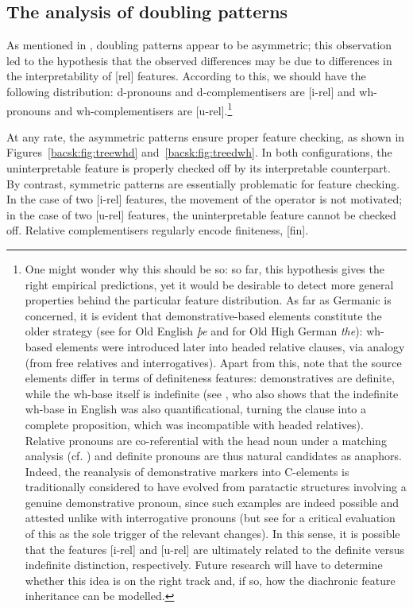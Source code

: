 \documentclass[output=paper]{langscibook}
\begin{document}
\subsection{The analysis of doubling patterns} \label{bacsk:sec:analysisdoubling}
As mentioned in , doubling patterns appear to be asymmetric; this observation led \citet{bacskaiatkari2020jcgl} to the hypothesis that the observed differences may be due to differences in the interpretability of [rel] features. According to this, we should have the following distribution: d-pronouns and d-complementisers are [i-rel] and wh-pronouns and wh-complementisers are [u-rel].\footnote{One might wonder why this should be so: so far, this hypothesis gives the right empirical predictions, yet it would be desirable to detect more general properties behind the particular feature distribution. As far as Germanic is concerned, it is evident that demonstrative-based elements constitute the older strategy (see \citealt[467]{ringetaylor2014} for Old English \textit{þe} and \citealt[46]{axeltober2017} for Old High German \textit{the}): wh-based elements were introduced later into headed relative clauses, via analogy (from free relatives and interrogatives). Apart from this, note that the source elements differ in terms of definiteness features: demonstratives are definite, while the wh-base itself is indefinite (see \citealt{watanabe2009}, who also shows that the indefinite wh-base in English was also quantificational, turning the clause into a complete proposition, which was incompatible with headed relatives). Relative pronouns are co-referential with the head noun under a matching analysis (cf. \citealt[55--179]{salzmann2017}) and definite pronouns are thus natural candidates as anaphors. Indeed, the reanalysis of demonstrative markers into C-elements is traditionally considered to have evolved from paratactic structures involving a genuine demonstrative pronoun, since such examples are indeed possible and attested unlike with interrogative pronouns (but see \citealt{axeltober2017} for a critical evaluation of this as the sole trigger of the relevant changes). In this sense, it is possible that the features [i-rel] and [u-rel] are ultimately related to the definite versus indefinite distinction, respectively. Future research will have to determine whether this idea is on the right track and, if so, how the diachronic feature inheritance can be modelled.}

At any rate, the asymmetric patterns ensure proper feature checking, as shown in Figures~\ref{bacsk:fig:treewhd} and~\ref{bacsk:fig:treedwh}. In both configurations, the uninterpretable feature is properly checked off by its interpretable counterpart. By contrast, symmetric patterns are essentially problematic for feature checking. In the case of two [i-rel] features, the movement of the operator is not motivated; in the case of two [u-rel] features, the uninterpretable feature cannot be checked off. Relative complementisers regularly encode finiteness, [fin].
\end{document}
